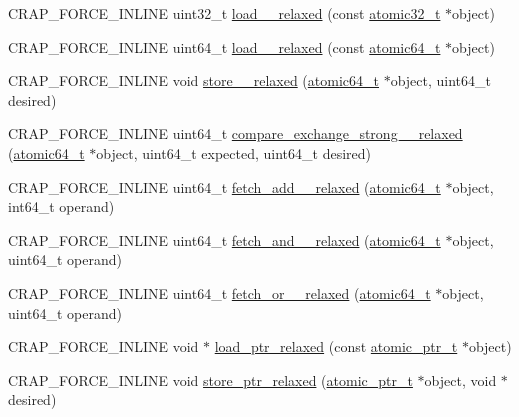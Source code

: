 \begin{DoxyCompactItemize}
\item 
C\+R\+A\+P\+\_\+\+F\+O\+R\+C\+E\+\_\+\+I\+N\+L\+I\+N\+E uint32\+\_\+t \hyperlink{namespacecrap_a07cb414f50be2b88d80ea9ae8c119ebb}{load\+\_\+\_\+relaxed} (const \hyperlink{structcrap_1_1atomic32__t}{atomic32\+\_\+t} $\ast$object)
\item 
C\+R\+A\+P\+\_\+\+F\+O\+R\+C\+E\+\_\+\+I\+N\+L\+I\+N\+E uint64\+\_\+t \hyperlink{namespacecrap_a8cd2d556f287527a3a82cdd4a55a6bd8}{load\+\_\+\_\+relaxed} (const \hyperlink{structcrap_1_1atomic64__t}{atomic64\+\_\+t} $\ast$object)
\item 
C\+R\+A\+P\+\_\+\+F\+O\+R\+C\+E\+\_\+\+I\+N\+L\+I\+N\+E void \hyperlink{namespacecrap_a28376b5dab77719f595c33cd6488f93d}{store\+\_\+\_\+relaxed} (\hyperlink{structcrap_1_1atomic64__t}{atomic64\+\_\+t} $\ast$object, uint64\+\_\+t desired)
\item 
C\+R\+A\+P\+\_\+\+F\+O\+R\+C\+E\+\_\+\+I\+N\+L\+I\+N\+E uint64\+\_\+t \hyperlink{namespacecrap_aab28fcb5edef34423173f222b0c1775f}{compare\+\_\+exchange\+\_\+strong\+\_\+\_\+relaxed} (\hyperlink{structcrap_1_1atomic64__t}{atomic64\+\_\+t} $\ast$object, uint64\+\_\+t expected, uint64\+\_\+t desired)
\item 
C\+R\+A\+P\+\_\+\+F\+O\+R\+C\+E\+\_\+\+I\+N\+L\+I\+N\+E uint64\+\_\+t \hyperlink{namespacecrap_a74b1eeadd27dab843b99607fcd617a3b}{fetch\+\_\+add\+\_\+\_\+relaxed} (\hyperlink{structcrap_1_1atomic64__t}{atomic64\+\_\+t} $\ast$object, int64\+\_\+t operand)
\item 
C\+R\+A\+P\+\_\+\+F\+O\+R\+C\+E\+\_\+\+I\+N\+L\+I\+N\+E uint64\+\_\+t \hyperlink{namespacecrap_adfa4ba5cf8bf7e816ad7f8351dd39bff}{fetch\+\_\+and\+\_\+\_\+relaxed} (\hyperlink{structcrap_1_1atomic64__t}{atomic64\+\_\+t} $\ast$object, uint64\+\_\+t operand)
\item 
C\+R\+A\+P\+\_\+\+F\+O\+R\+C\+E\+\_\+\+I\+N\+L\+I\+N\+E uint64\+\_\+t \hyperlink{namespacecrap_af1c3b7ce6841fc87f3cd1ca8df004e11}{fetch\+\_\+or\+\_\+\_\+relaxed} (\hyperlink{structcrap_1_1atomic64__t}{atomic64\+\_\+t} $\ast$object, uint64\+\_\+t operand)
\item 
C\+R\+A\+P\+\_\+\+F\+O\+R\+C\+E\+\_\+\+I\+N\+L\+I\+N\+E void $\ast$ \hyperlink{namespacecrap_a1bda807e593bb56b1be32a0c7e11537a}{load\+\_\+ptr\+\_\+relaxed} (const \hyperlink{structcrap_1_1atomic__ptr__t}{atomic\+\_\+ptr\+\_\+t} $\ast$object)
\item 
C\+R\+A\+P\+\_\+\+F\+O\+R\+C\+E\+\_\+\+I\+N\+L\+I\+N\+E void \hyperlink{namespacecrap_a0fc644a4e7682083464c7ec99b8c94be}{store\+\_\+ptr\+\_\+relaxed} (\hyperlink{structcrap_1_1atomic__ptr__t}{atomic\+\_\+ptr\+\_\+t} $\ast$object, void $\ast$desired)

\end{DoxyCompactItemize}
